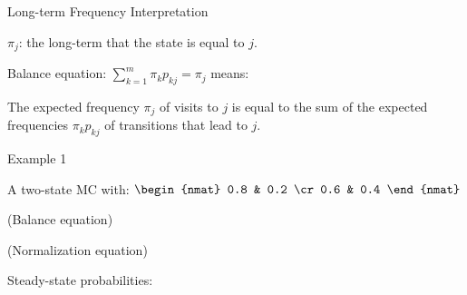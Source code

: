\begin{frame}{Long-term Frequency Interpretation}

\plitemsep 0.1in
\bci

\item $\pi_j$: the long-term  that the state is equal to $j.$

\item<2-> Balance equation: $\sum_{k=1}^m \pi_k p_{kj} = \pi_j$ means:

\bci
\item<3->  The expected frequency $\pi_j$ of visits to $j$ is equal to the sum of the expected frequencies $\pi_k p_{kj}$ of transitions that lead to $j.$
\eci
\eci

\vspace{-0.5cm}
\end{frame}



\begin{frame}{Example 1}

\plitemsep 0.1in
\bci

\item A two-state MC with:
  $
  \begin{nmat}
    0.8 & 0.2 \cr
    0.6 & 0.4 
  \end{nmat}
  $

\item (Balance equation) 
\item (Normalization equation) 

\item Steady-state probabilities: 

\eci
\end{frame}




